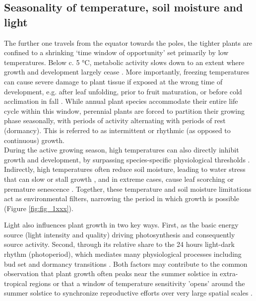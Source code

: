 \documentclass{article}
\begin{document}
	\subsection*{Seasonality of temperature, soil moisture and light}
		The further one travels from the equator towards the poles, the tighter plants are confined to a shrinking `time window of opportunity' set primarily by low temperatures. Below c. 5 °C, metabolic activity slows down to an extent where growth and development largely cease  \citep{schenkerPhysiologicalMinimumTemperatures2014, rossiCriticalTemperaturesXylogenesis2008, kornerWinterCropGrowth2008}. More importantly, freezing temperatures can cause severe damage to plant tissue if exposed at the wrong time of development, e.g. after leaf unfolding, prior to fruit maturation, or before cold acclimation in fall \citep{sakaiFreezingInjuriesPlants1987c, baumgartenNoRiskNo2023a}. 
		While annual plant species accommodate their entire life cycle within this window, perennial plants are forced to partition their growing phase seasonally, with periods of activity alternating with periods of rest (dormancy). This is referred to as intermittent or rhythmic (as opposed to continuous) growth. \\

		During the active growing season, high temperatures can also directly inhibit growth and development, by surpassing species-specific physiological thresholds \citep{osullivanThermalLimitsLeaf2017}. Indirectly, high temperatures often reduce soil moisture, leading to water stress that can slow or stall growth \citep{hsiaoPlantResponsesWater1973, pugnaireConstraintsWaterStress1999, etzoldNumberGrowthDays2021}, and in extreme cases, cause leaf scorching or premature senescence \citep{estiarteAlterationPhenologyLeaf2015a}. Together, these temperature and soil moisture limitations act as environmental filters, narrowing the period in which growth is possible (Figure \ref{fig:fig_1xxx}). 
		
		Light also influences plant growth in two key ways. First, as the basic energy source (light intensity and quality) driving photosynthesis and consequently source activity. Second, through its relative share to the 24 hours light-dark rhythm (photoperiod), which mediates many physiological processes including bud set and dormancy transitions \citep{wangPlantsDistinguishDifferent2024b}. Both factors may contribute to the common observation that plant growth often peaks near the summer solstice in extra-tropical regions \citep{rossiConifersColdEnvironments2006, etzoldNumberGrowthDays2021, luoSummerSolsticeMarks2018} or that a window of temperature sensitivity 'opens’ around the summer solstice to synchronize reproductive efforts over very large spatial scales \citep{journeSummerSolsticeOrchestrates2024}.
		
\end{document}
